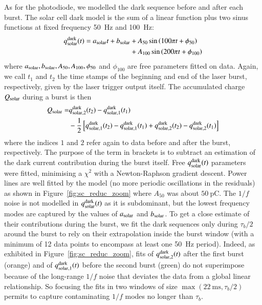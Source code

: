 As for the photodiode, we modelled the dark sequence before and after each burst. The solar cell dark model is the sum of a linear function plus two sinus functions at fixed frequency \SI{50}{\hertz} and \SI{100}{\hertz}:
\begin{align}
    q_{\rm solar}^{\rm dark}(t) = a_{\rm solar}t + b_{\rm solar} & + A_{50} \sin \left( 100 \pi t + \phi_{50}\right)  \notag \\  & +  A_{100} \sin \left( 200 \pi t + \phi_{100}\right)
\end{align}
where $a_{\rm solar}, b_{\rm solar}, A_{50}, A_{100}, \phi_{50}$ and $\phi_{100}$ are free parameters fitted on data. 
Again, we call $t_1$ and $t_2$ the time stamps of the beginning and end of the laser burst, respectively, given by the laser trigger output itself.
The accumulated charge $Q_{\mathrm{solar}}$ during a burst is then
\begin{align}\label{eq:qsolar}
Q_{\mathrm{solar}}  = & q_{\rm solar,2}^{\rm dark}(t_2) - q_{\rm solar, 1}^{\rm dark}(t_1) \\  &  - \frac{1}{2} \left[q_{\rm solar,1}^{\rm dark}(t_2) - q_{\rm solar,1}^{\rm dark}(t_1) + q_{\rm solar,2}^{\rm dark}(t_2) - q_{\rm solar,2}^{\rm dark}(t_1)  \right]    \notag
\end{align}
where the indices $1$ and $2$ refer again to data before and after the burst, respectively. The purpose of the term in brackets is to subtract an estimation of the dark current contribution during the burst itself. Free $q_{\rm solar}^{\rm dark}(t)$ parameters were fitted, minimising a $\chi^2$ with a Newton-Raphson gradient descent. Power lines are well fitted by the model (no more periodic oscillations in the residuals) as shown in Figure~\ref{fig:sc_reduc_zoom} where $A_{50}$ was about $\SI{50}{\pico\coulomb}$.
The $1/f$ noise is not modelled in $q_{\rm solar}^{\rm dark}(t)$ as it is subdominant, but the lowest frequency modes are captured by the values of $a_{\rm solar}$ and $b_{\rm solar}$. To get a close estimate of their contributions during the burst, we fit the dark sequences only during $\tau_b/2$ around the burst to rely on their extrapolation inside the burst window (with a minimum of 12 data points to encompass at least one \SI{50}{\hertz} period). %
Indeed, as exhibited in Figure~\ref{fig:sc_reduc_zoom}, fits of $q_{\rm solar,2}^{\rm dark}(t)$ after the first burst (orange) and of $q_{\rm solar,1}^{\rm dark}(t)$ before the second burst (green) do not superimpose because of the long-range $1/f$ noise that deviates the data from a global linear relationship. So focusing the fits in two windows of size $\max(\SI{22}{\ms},\tau_b/2)$ permits to capture contaminating $1/f$ modes no longer than $\tau_b$. 

